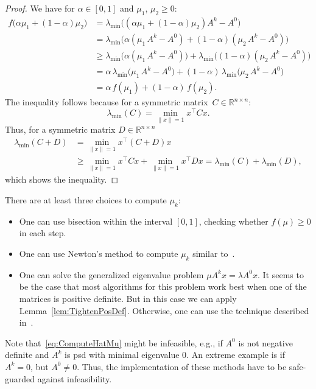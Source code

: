 \documentclass[10pt, a4paper]{article}
\newcommand{\norm}[1]{\lVert{#1}\rVert}
\newcommand{\T}{^{\top}}
\newcommand{\R}{\mathds{R}}
\begin{document}
\begin{proof}
  We have for $\alpha \in [0,1]$ and $\mu_1$, $\mu_2 \geq 0$:
  \begin{align*}
    f\big(\alpha \mu_1 + (1 - \alpha) \mu_2\big)
    & = \lambda_{\min}\big((\alpha \mu_1 + (1 - \alpha) \mu_2) A^k - A^0\big)\\
    & = \lambda_{\min}\big(\alpha (\mu_1\, A^k - A^0) + (1 - \alpha) (\mu_2\, A^k - A^0)\big)\\
    & \geq \lambda_{\min}\big(\alpha (\mu_1\, A^k - A^0)\big) + \lambda_{\min}\big((1 - \alpha) (\mu_2\, A^k - A^0)\big)\\
    & = \alpha\, \lambda_{\min}\big(\mu_1\, A^k - A^0\big) + (1 - \alpha)\, \lambda_{\min}\big(\mu_2\, A^k - A^0\big)\\
    & = \alpha\, f(\mu_1) + (1 - \alpha)\, f(\mu_2).
  \end{align*}
  The inequality follows because for a symmetric matrix~$C \in \R^{n \times n}$:
  \[
    \lambda_{\min}(C) = \min_{\norm{x} = 1} x\T C x.
  \]
  Thus, for a symmetric matrix $D \in \R^{n \times n}$
  \begin{align*}
    \lambda_{\min}(C + D) & = \min_{\norm{x} = 1} x\T (C + D) x\\
    & \geq \min_{\norm{x} = 1} x\T C  x + \min_{\norm{x} = 1} x\T D x =
    \lambda_{\min}(C) + \lambda_{\min}(D),
  \end{align*}
  which shows the inequality.
\end{proof}

\noindent
There are at least three choices to compute $\mu_k$:
\begin{itemize}[leftmargin=3ex]
\item One can use bisection within the interval $[0,1]$, checking whether
  $f(\mu) \geq 0$ in each step.
\item One can use Newton's method to compute $\mu_k$ similar
  to~\cite{Str16,HigSS16}.
\item One can solve the generalized eigenvalue problem $\mu A^k x = \lambda
  A^0 x$. It seems to be the case that most algorithms for this problem
  work best when one of the matrices is positive definite. But in this case
  we can apply Lemma~\ref{lem:TightenPosDef}. Otherwise, one can use the
  technique described in~\cite{Str16,HigSS16}. 
\end{itemize}

Note that~\eqref{eq:ComputeHatMu} might be infeasible, e.g., if $A^0$ is
not negative definite and $A^k$ is psd with minimal eigenvalue 0. An
extreme example is if $A^k = 0$, but $A^0 \neq 0$. Thus, the implementation
of these methods have to be safe-guarded against infeasibility.
\end{document}
